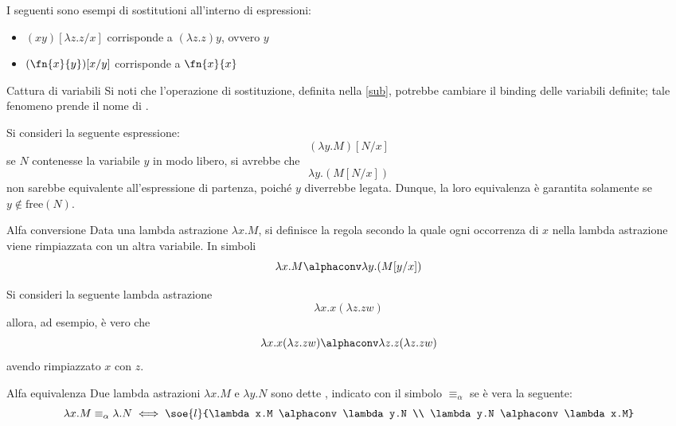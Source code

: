 \documentclass[a4paper, 12pt]{report}
\begin{document}
    \begin{example}[Sostituzioni]
        I seguenti sono esempi di sostitutioni all'interno di espressioni:

        \begin{itemize}
            \item $(xy)[\lambda z.z/x]$ corrisponde a $(\lambda z.z)y$, ovvero $y$
            \item $(\fn{x}{y})[x/y]$ corrisponde a $\fn{x}{x}$
        \end{itemize}
    \end{example}

    \begin{framedobs}{Cattura di variabili}
        Si noti che l'operazione di sostituzione, definita nella \cref{sub}, potrebbe cambiare il binding delle variabili definite; tale fenomeno prende il nome di .
    \end{framedobs}

    \begin{example}
        Si consideri la seguente espressione: $$(\lambda y.M)[N/x]$$ se $N$ contenesse la variabile $y$ in modo libero, si avrebbe che $$\lambda y.(M[N/x])$$ non sarebbe equivalente all'espressione di partenza, poiché $y$ diverrebbe legata. Dunque, la loro equivalenza è garantita solamente se $y \notin \mathrm{free}(N)$.
    \end{example}

    \begin{frameddefn}{Alfa conversione}
        Data una lambda astrazione $\lambda x.M$, si definisce  la regola secondo la quale ogni occorrenza di $x$ nella lambda astrazione viene rimpiazzata con un altra variabile. In simboli $$\lambda x.M \alphaconv \lambda y.(M[y/x])$$
    \end{frameddefn}

    \begin{example}
        Si consideri la seguente lambda astrazione $$\lambda x.x(\lambda z.zw)$$ allora, ad esempio, è vero che $$\lambda x.x(\lambda z.zw) \alphaconv \lambda z.z(\lambda z.zw)$$ avendo rimpiazzato $x$ con $z$.
    \end{example}

    \begin{frameddefn}[label={alpha equiv}]{Alfa equivalenza}
        Due lambda astrazioni $\lambda x.M$ e $\lambda y.N$ sono dette , indicato con il simbolo $\equiv_\alpha$ se è vera la seguente: $$\lambda x.M \equiv_\alpha \lambda .N \iff \soe{l}{\lambda x.M \alphaconv \lambda y.N \\ \lambda y.N \alphaconv \lambda x.M}$$
    \end{frameddefn}
\end{document}
